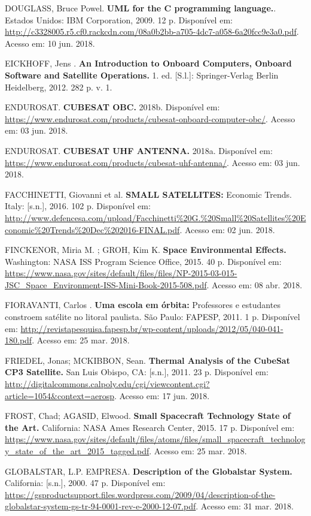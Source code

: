 \noindent DOUGLASS, Bruce Powel. \textbf{UML for the C programming language.}. Estados Unidos: IBM Corporation, 2009. 12 p. Disponível em: \url{http://c3328005.r5.cf0.rackcdn.com/08a0b2bb-a705-4dc7-a058-6a20fcc9e3a0.pdf}. Acesso em: 10 jun. 2018.

\noindent EICKHOFF, Jens . \textbf{An Introduction to Onboard Computers, Onboard Software and Satellite Operations.} 1. ed. [S.l.]: Springer-Verlag Berlin Heidelberg, 2012. 282 p. v. 1.

\noindent ENDUROSAT. \textbf{CUBESAT OBC. } 2018b. Disponível em: \url{https://www.endurosat.com/products/cubesat-onboard-computer-obc/}. Acesso em: 03 jun. 2018.

\noindent ENDUROSAT. \textbf{CUBESAT UHF ANTENNA. } 2018a. Disponível em: \url{https://www.endurosat.com/products/cubesat-uhf-antenna/}. Acesso em: 03 jun. 2018.

\noindent FACCHINETTI, Giovanni et al. \textbf{SMALL SATELLITES: } Economic Trends. Italy: [s.n.], 2016. 102 p. Disponível em: \url{http://www.defencesa.com/upload/Facchinetti\%20G.\%20Small\%20Satellites\%20Economic\%20Trends\%20Dec\%202016-FINAL.pdf}. Acesso em: 02 jun. 2018.

\noindent FINCKENOR, Miria M. ; GROH, Kim K. \textbf{Space Environmental Effects. } Washington: NASA ISS Program Science Office, 2015. 40 p. Disponível em: \url{https://www.nasa.gov/sites/default/files/files/NP-2015-03-015-JSC_Space_Environment-ISS-Mini-Book-2015-508.pdf}. Acesso em: 08 abr. 2018.

\noindent FIORAVANTI, Carlos . \textbf{Uma escola em órbita: } Professores e estudantes constroem satélite no litoral paulista. São Paulo: FAPESP, 2011. 1 p. Disponível em: \url{http://revistapesquisa.fapesp.br/wp-content/uploads/2012/05/040-041-180.pdf}. Acesso em: 25 mar. 2018.

\noindent FRIEDEL, Jonas; MCKIBBON, Sean. \textbf{Thermal Analysis of the CubeSat CP3 Satellite. } San Luis Obispo, CA: [s.n.], 2011. 23 p. Disponível em: \url{http://digitalcommons.calpoly.edu/cgi/viewcontent.cgi?article=1054&context=aerosp}. Acesso em: 17 jun. 2018.

\noindent FROST, Chad; AGASID, Elwood. \textbf{Small Spacecraft Technology State of the Art. } California: NASA Ames Research Center, 2015. 17 p. Disponível em: \url{https://www.nasa.gov/sites/default/files/atoms/files/small_spacecraft_technology_state_of_the_art_2015_tagged.pdf}. Acesso em: 25 mar. 2018.

\noindent GLOBALSTAR, L.P. EMPRESA. \textbf{Description of the Globalstar System. } California: [s.n.], 2000. 47 p. Disponível em: \url{https://gsproductsupport.files.wordpress.com/2009/04/description-of-the-globalstar-system-gs-tr-94-0001-rev-e-2000-12-07.pdf}. Acesso em: 31 mar. 2018.

